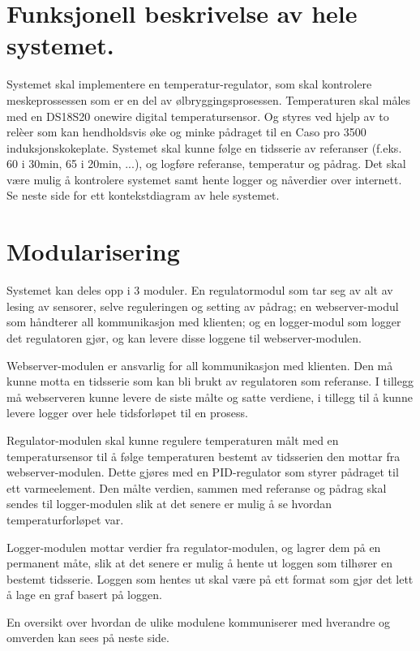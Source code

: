 \section{Funksjonell beskrivelse av hele systemet.}

Systemet skal implementere en temperatur-regulator, som skal kontrolere
meskeprossessen som er en del av ølbryggingsprosessen. Temperaturen skal måles
med en DS18S20 onewire digital temperatursensor. Og styres ved hjelp av to
relèer som kan hendholdsvis øke og minke pådraget til en Caso pro 3500
induksjonskokeplate. Systemet skal kunne følge en tidsserie av referanser
(f.eks. 60\textdegree{} i 30min, 65\textdegree{} i 20min, ...), og logføre referanse,
temperatur og pådrag. Det skal være mulig å kontrolere systemet samt hente
logger og nåverdier over internett. Se neste side for ett kontekstdiagram av hele 
systemet.

\newpage

\newpage

\section{Modularisering}
Systemet kan deles opp i 3 moduler. En regulatormodul som tar seg av alt av
lesing av sensorer, selve reguleringen og setting av pådrag; en webserver-modul
som håndterer all kommunikasjon med klienten; og en logger-modul som
logger det regulatoren gjør, og kan levere disse loggene til webserver-modulen.

Webserver-modulen er ansvarlig for all kommunikasjon med klienten. Den må kunne
motta en tidsserie som kan bli brukt av regulatoren som referanse. I tillegg må
webserveren kunne levere de siste målte og satte verdiene, i tillegg til å kunne
levere logger over hele tidsforløpet til en prosess.

Regulator-modulen skal kunne regulere temperaturen målt med en temperatursensor
til å følge temperaturen bestemt av tidsserien den mottar fra webserver-modulen.
Dette gjøres med en PID-regulator som styrer pådraget til ett varmeelement. Den
målte verdien, sammen med referanse og pådrag skal sendes til logger-modulen
slik at det senere er mulig å se hvordan temperaturforløpet var.

Logger-modulen mottar verdier fra regulator-modulen, og lagrer dem på en
permanent måte, slik at det senere er mulig å hente ut loggen som tilhører en
bestemt tidsserie. Loggen som hentes ut skal være på ett format som gjør det
lett å lage en graf basert på loggen.

En oversikt over hvordan de ulike modulene kommuniserer med hverandre og
omverden kan sees på neste side.

\newpage


